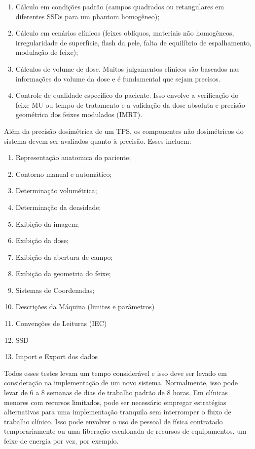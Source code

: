 \documentclass[11pt,a4paper]{article}
\newcounter{exemplo}
\begin{document}
	\begin{enumerate}[label=\textcolor{CarnationPink}{\roman*.}]
		\item Cálculo em condições padrão (campos quadrados ou retangulares em diferentes SSDs para um phantom homogêneo);
		\item Cálculo em cenários clínicos (feixes oblíquos, materiais não homogêneos, irregularidade de superfície, flash da pele, falta de equilíbrio de espalhamento, modulação de feixe);
		\item Cálculos de volume de dose. Muitos julgamentos clínicos são baseados nas informações do volume da dose e é fundamental que sejam precisos.
		\item Controle de qualidade específico do paciente. Isso envolve a verificação do feixe MU ou tempo de tratamento e a validação da dose absoluta e precisão geométrica dos feixes modulados (IMRT).
	\end{enumerate}

	Além da precisão dosimétrica de um TPS, os componentes não dosimétricos do sistema devem ser avaliados quanto à precisão. Esses incluem:

	\begin{enumerate}[label=\textcolor{CarnationPink}{\roman*.}]
		\item Representação anatomica do paciente;
		\item Contorno manual e automático;
		\item Determinação volumétrica;
		\item Determinação da densidade;
		\item Exibição da imagem;
		\item Exibição da dose;
		\item Exibição da abertura de campo;
		\item Exibição da geometria do feixe;
		\item Sistemas de Coordenadas;
		\item Descrições da Máquina (limites e parâmetros)
		\item Convenções de Leituras (IEC)
		\item SSD
		\item Import e Export dos dados
	\end{enumerate}

	Todos esses testes levam um tempo considerável e isso deve ser levado em consideração na implementação de um novo sistema. Normalmente, isso pode levar de 6 a 8 semanas de dias de trabalho padrão de 8 horas. Em clínicas menores com recursos limitados, pode ser necessário empregar estratégias alternativas para uma implementação tranquila sem interromper o fluxo de trabalho clínico. Isso pode envolver o uso de pessoal de física contratado temporariamente ou uma liberação escalonada de recursos de equipamentos, um feixe de energia por vez, por exemplo.
\end{document}
